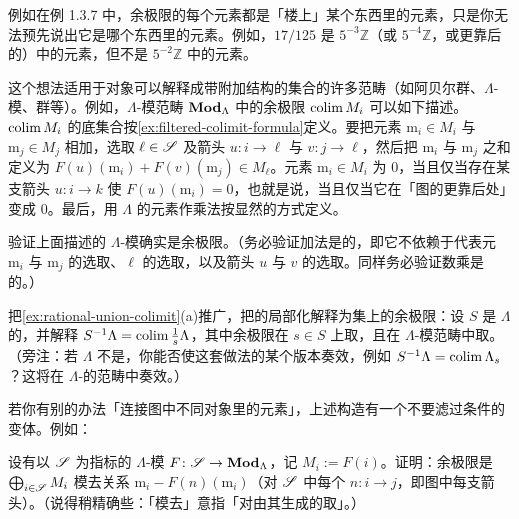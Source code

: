 例如在例 1.3.7 中，余极限的每个元素都是「楼上」某个东西里的元素，只是你无法预先说出它是哪个东西里的元素。例如，$17/125$ 是 $5^{-3}\mathbb{Z}$（或 $5^{-4}\mathbb{Z}$，或更靠后的）中的元素，但不是 $5^{-2}\mathbb{Z}$ 中的元素。

这个想法适用于对象可以解释成带附加结构的集合的许多范畴（如阿贝尔群、$\Lambda$-模、群等）。例如，$\Lambda$-模范畴 $\mathbf{Mod}_{\Lambda}$ 中的余极限 $\operatorname{colim} M_i$ 可以如下描述。$\operatorname{colim} M_i$ 的底集合按\cref{ex:filtered-colimit-formula}定义。要把元素 $\mathrm{m}_i\in M_i$ 与 $\mathrm{m}_j\in M_j$ 相加，选取 $\ell\in\mathscr{S}$ 及箭头 $u\colon i\to\ell$ 与 $v\colon j\to\ell$，然后把 $\mathrm{m}_i$ 与 $\mathrm{m}_j$ 之和定义为 $F(u)(\mathrm{m}_i)+F(v)(\mathrm{m}_j)\in M_\ell$。元素 $\mathrm{m}_i\in M_i$ 为 $0$，当且仅当存在某支箭头 $u\colon i\to k$ 使 $F(u)(\mathrm{m}_i)=0$，也就是说，当且仅当它在「图的更靠后处」变成 $0$。最后，用 $\Lambda$ 的元素作乘法按显然的方式定义。

\begin{exercise}\label{ex:module-colimit-verification}
验证上面描述的 $\Lambda$-模确实是余极限。（务必验证加法是\trWellDefined{}的，即它不依赖于代表元 $\mathrm{m}_i$ 与 $\mathrm{m}_j$ 的选取、$\ell$ 的选取，以及箭头 $u$ 与 $v$ 的选取。同样务必验证数乘是\trWellDefined{}的。）
\end{exercise}

\begin{exercise}\label{ex:localization-as-colimit}
把\cref{ex:rational-union-colimit}(a)推广，把\trIntegralDomain{}的局部化解释为\trFiltered{}集上的余极限：设 $S$ 是 $\Lambda$ 的\trMultiplicativeSubset，并解释 $S^{-1}\Lambda=\operatorname{colim}\frac{1}{s}\Lambda$，其中余极限在 $s\in S$ 上取，且在 $\Lambda$-模范畴中取。（旁注：若 $\Lambda$ 不是\trIntegralDomain，你能否使这套做法的某个版本奏效，例如 $S^{-1}\Lambda=\operatorname{colim}\Lambda_s$？这将在 $\Lambda$-\trAlgebra{}的范畴中奏效。）
\end{exercise}

若你有别的办法「连接图中不同对象里的元素」，上述构造有一个不要滤过条件的变体。例如：

\begin{exercise}\label{ex:unfiltered-module-colimit}
设有以 $\mathscr{S}$ 为指标的 $\Lambda$-模\trDiagram{} $F\colon\mathscr{S}\to\mathbf{Mod}_{\Lambda}$，记 $M_i:=F(i)$。证明：余极限是 $\bigoplus_{i\in\mathscr{S}}M_i$ 模去关系 $\mathrm{m}_i-F(n)(\mathrm{m}_i)$（对 $\mathscr{S}$ 中每个 $n\colon i\to j$，即图中每支箭头）。（说得稍精确些：「模去」意指「对由其生成的\trSubmodule{}取\trQuotient」。）
\end{exercise}

